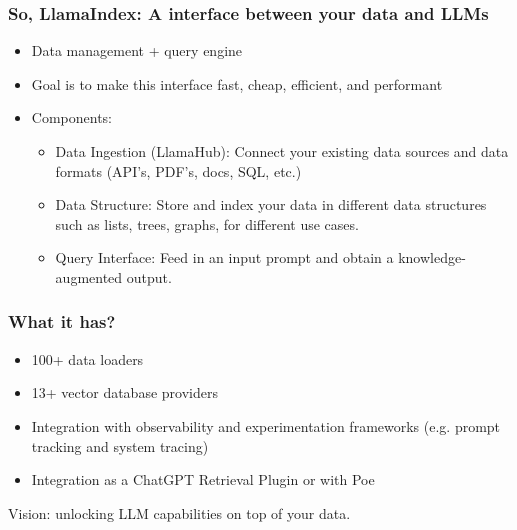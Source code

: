 \begin{frame}[fragile]\frametitle{So, LlamaIndex: A interface between your data and LLMs }


\begin{itemize}
\item Data management + query engine
\item Goal is to make this interface fast, cheap, efficient, and performant 
\item Components:
	\begin{itemize}
	\item Data Ingestion (LlamaHub): Connect your existing data sources and data formats (API’s, PDF’s, docs, SQL, etc.)
	\item Data Structure: Store and index your data in different data structures such as lists, trees, graphs, for different use cases. 
	\item Query Interface: Feed in an input prompt and obtain a knowledge-augmented output.
	\end{itemize}	

\end{itemize}	
\end{frame}

\begin{frame}[fragile]\frametitle{What it has?}


\begin{itemize}
\item 100+ data loaders
\item 13+ vector database providers
\item Integration with observability and experimentation frameworks (e.g. prompt tracking and system tracing)
\item Integration as a ChatGPT Retrieval Plugin or with Poe
\end{itemize}	

Vision: unlocking LLM capabilities on top of your data.
\end{frame}
